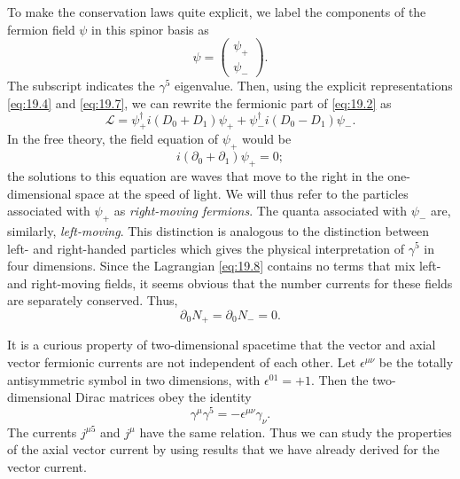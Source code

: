To make the conservation laws quite explicit, we label the components of the
fermion field $\psi$ in this spinor basis as
\begin{equation}
  \psi = \begin{pmatrix}\psi_+\\ \psi_-\end{pmatrix} .
  \label{eq:19.7}
\end{equation}
The subscript indicates the $\gamma^5$ eigenvalue.  Then, using the explicit
representations \eqref{eq:19.4} and \eqref{eq:19.7}, we can rewrite the
fermionic part of \eqref{eq:19.2} as
\begin{equation}
  \mathcal{L} = \psi^{\dagger}_+ i(D_0 + D_1)\psi_+
    + \psi^{\dagger}_- i(D_0 - D_1)\psi_- .
  \label{eq:19.8}
\end{equation}
In the free theory, the field equation of $\psi_+$ would be
\begin{equation}
  i(\partial_0 + \partial_1)\psi_+ = 0 ;
  \label{eq:19.9}
\end{equation}
the solutions to this equation are waves that move to the right in the
one-dimensional space at the speed of light.  We will thus refer to the
particles associated with $\psi_+$ as \emph{right-moving fermions}.  The
quanta associated with $\psi_-$ are, similarly, \emph{left-moving}.  This
distinction is analogous to the distinction between left- and right-handed
particles which gives the physical interpretation of $\gamma^5$ in four
dimensions.  Since the Lagrangian \eqref{eq:19.8} contains no terms that mix
left- and right-moving fields, it seems obvious that the number currents for
these fields are separately conserved.  Thus,
\begin{equation}
  \partial_0 N_+ = \partial_0 N_- = 0 .
  \label{eq:19.10}
\end{equation}

It is a curious property of two-dimensional spacetime that the vector and
axial vector fermionic currents are not independent of each other.  Let
$\epsilon^{\mu\nu}$ be the totally antisymmetric symbol in two dimensions,
with $\epsilon^{01} = +1$.  Then the two-dimensional Dirac matrices obey the
identity
\begin{equation}
  \gamma^\mu\gamma^5 = -\epsilon^{\mu\nu}\gamma_\nu .
  \label{eq:19.11}
\end{equation}
The currents $j^{\mu 5}$ and $j^\mu$ have the same relation.  Thus we can study
the properties of the axial vector current by using results that we have
already derived for the vector current.


